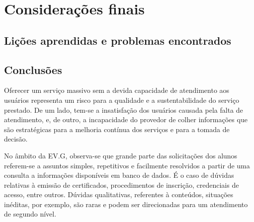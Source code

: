 %
%
%
%

\chapter{Considerações finais}


\section{Lições aprendidas e problemas encontrados}



\section{Conclusões}
Oferecer um serviço massivo sem a devida capacidade de atendimento aos usuários representa um risco para a qualidade e a sustentabilidade do serviço prestado. De um lado, tem-se a insatisfação dos usuários causada pela falta de atendimento, e, de outro, a incapacidade do provedor de colher informações que são estratégicas para a melhoria contínua dos serviços e para a tomada de decisão.

No âmbito da EV.G, observa-se que grande parte das solicitações dos alunos referem-se a assuntos simples, repetitivos e facilmente resolvidos a partir de uma consulta a informações disponíveis em banco de dados. É o caso de dúvidas relativas à emissão de certificados, procedimentos de inscrição, credenciais de acesso, entre outros. Dúvidas qualitativas, referentes à conteúdos, situações inéditas, por exemplo, são raras e podem ser direcionadas para um atendimento de segundo nível.  

